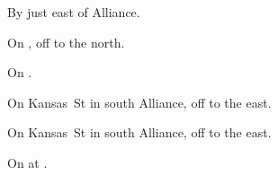 
\begin{LocationList}

By  just east of Alliance.

On , off  to the north.

On  .

On Kansas~St in south Alliance, off  to the east.

\Location{\TruckService \Service}
On Kansas~St in south Alliance, off  to the east.

\Location{\TruckStop \Gas \Rest}
On  at .

\end{LocationList}
